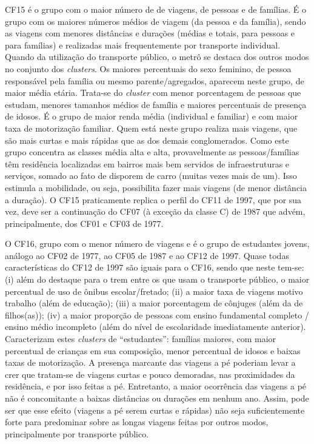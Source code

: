 CF15 é o grupo com o maior número de de viagens, de pessoas e de famílias. 
É o grupo com os maiores números médios de viagem (da pessoa e da família), sendo as viagens com menores distâncias e durações (médias e totais, para pessoas e para famílias) e realizadas mais frequentemente por transporte individual. 
Quando da utilização do transporte público, o metrô se destaca dos outros modos no conjunto dos \textit{clusters}.
Os maiores percentuais do sexo feminino, de pessoa responsável pela família ou mesmo parente/agregados, aparecem neste grupo, de maior média etária.
Trata-se do \textit{cluster} com menor porcentagem de pessoas que estudam, menores tamanhos médios de família e maiores percentuais de presença de idosos.
É o grupo de maior renda média (individual e familiar) e com maior taxa de motorização familiar.
Quem está neste grupo realiza mais viagens, que são mais curtas e mais rápidas que as dos demais conglomerados.
Como este grupo concentra as classes média alta e alta, provavelmente as pessoas/famílias têm residência localizadas em bairros mais bem servidos de infraestruturas e serviços, somado ao fato de disporem de carro (muitas vezes mais de um). Isso estimula a mobilidade, ou seja, possibilita fazer mais viagens (de menor distância a duração).
O CF15 praticamente replica o perfil do CF11 de 1997, que por sua vez, deve ser a continuação do CF07 (à exceção da classe C) de 1987 que advém, principalmente, dos CF01 e CF03 de 1977.

O CF16, grupo com o menor número de viagens e é o grupo de estudantes jovens, análogo ao CF02 de 1977, ao CF05 de 1987 e ao CF12 de 1997.
Quase todas características do CF12 de 1997 são iguais para o CF16, sendo que neste tem-se:
(i) além do destaque para o trem entre os que usam o transporte público, o maior percentual de uso de ônibus escolar/fretado;
(ii) a maior taxa de viagens motivo trabalho (além de educação);
(iii) a maior porcentagem de cônjuges (além da de filhos(as));
(iv) a maior proporção de pessoas com ensino fundamental completo / ensino médio incompleto (além do nível de escolaridade imediatamente anterior).
Caracterizam estes \textit{clusters} de ``estudantes'': famílias maiores, com maior percentual de crianças em sua composição, menor percentual de idosos e baixas taxas de motorização.
A presença marcante das viagens a pé poderiam levar a crer que tratam-se de viagens curtas e pouco demoradas, nas proximidades da residência, e por isso feitas a pé. 
Entretanto, a maior ocorrência das viagens a pé não é concomitante a baixas distâncias ou durações em nenhum ano.
Assim, pode ser que esse efeito (viagens a pé serem curtas e rápidas) não seja suficientemente forte para predominar sobre as longas viagens feitas por outros modos, principalmente por transporte público.


